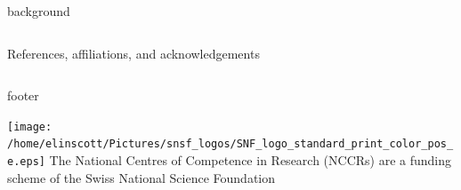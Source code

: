 \documentclass{beamer}
\begin{document}
\begin{frame}[t]{}
\begin{beamercolorbox}[ht=0.675\paperheight,wd=\textwidth]{background}
\begin{columns}[t]
\begin{column}{0.57\linewidth}
\begin{block}{References, affiliations, and acknowledgements}
                \end{block}
            \end{column}

        \end{columns}

    \end{beamercolorbox}

    \begin{beamercolorbox}[wd=\textwidth,sep=1em]{footer}
        \begin{minipage}{0.55\textwidth}
            \texttt{[image: /home/elinscott/Pictures/snsf\_logos/SNF\_logo\_standard\_print\_color\_pos\_e.eps]}
            \hspace{0.01\columnwidth}
            \tiny The National Centres of Competence in Research (NCCRs) are a funding scheme of the Swiss National Science Foundation
        \end{minipage}
        \hfill
    \end{beamercolorbox}

\end{frame}
\end{document}
